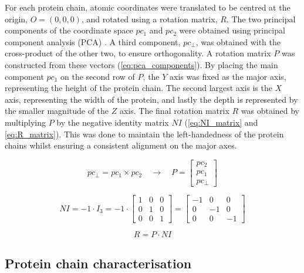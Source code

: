 For each protein chain, atomic coordinates were translated to be centred at the origin, $O = (0, 0, 0)$, and rotated using a rotation matrix, $R$. The two principal components of the coordinate space $pc_{1}$ and $pc_{2}$ were obtained using principal component analysis (PCA) \cite{HOTELLING_1933_PCA}. A third component, $pc_{\perp}$, was obtained with the cross-product of the other two, to ensure orthogonality. A rotation matrix $P$ was constructed from these vectors (\autoref{eq:pca_components}). By placing the main component $pc_{1}$ on the second row of $P$, the $Y$ axis was fixed as the major axis, representing the height of the protein chain. The second largest axis is the $X$ axis, representing the width of the protein, and lastly the depth is represented by the smaller magnitude of the $Z$ axis. The final rotation matrix $R$ was obtained by multiplying $P$ by the negative identity matrix $NI$ (\autoref{eq:NI_matrix} and \autoref{eq:R_matrix}). This was done to maintain the left-handedness of the protein chains whilst ensuring a consistent alignment on the major axes.

\begin{equation}
pc_{\perp} = pc_{1} \times pc_{2} \quad \rightarrow \quad P = \begin{bmatrix}
pc_{2} \\
pc_{1} \\
pc_{\perp}
\end{bmatrix}
\label{eq:pca_components}
\end{equation}

\begin{equation}
NI = -1 \cdot I_3 = -1 \cdot \begin{bmatrix}
1 & 0 & 0 \\
0 & 1 & 0 \\
0 & 0 & 1 
\end{bmatrix} = \begin{bmatrix}
-1 & 0 & 0 \\
0 & -1 & 0 \\
0 & 0 & -1 
\end{bmatrix}
\label{eq:NI_matrix}
\end{equation}

\begin{equation}
R = P \cdot NI
\label{eq:R_matrix}
\end{equation}

\subsection{Protein chain characterisation}

